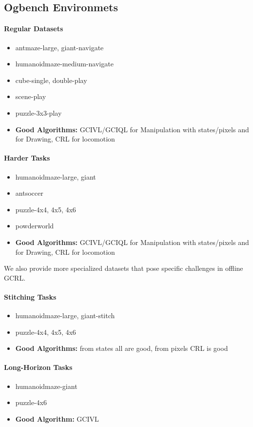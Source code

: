 \documentclass{article}
\theoremstyle{plain}
\theoremstyle{definition}
\theoremstyle{remark}
\begin{document}
\subsection{Ogbench Environmets}
\paragraph{Regular Datasets}
\begin{itemize}
    \item antmaze-{large, giant}-navigate
    \item humanoidmaze-medium-navigate
    \item cube-{single, double}-play
    \item scene-play
    \item puzzle-3x3-play
    \item \textbf{Good Algorithms:} GCIVL/GCIQL for Manipulation with states/pixels and for Drawing, CRL for locomotion
\end{itemize}

\paragraph{Harder Tasks}
\begin{itemize}
    \item humanoidmaze-{large, giant}
    \item antsoccer
    \item puzzle-{4x4, 4x5, 4x6}
    \item powderworld
    \item \textbf{Good Algorithms:} GCIVL/GCIQL for Manipulation with states/pixels and for Drawing, CRL for locomotion
\end{itemize}

We also provide more specialized datasets that pose specific challenges in offline GCRL.

\paragraph{Stitching Tasks}
\begin{itemize}
    \item humanoidmaze-{large, giant}-stitch
    \item puzzle-{4x4, 4x5, 4x6}
    \item \textbf{Good Algorithms:} from states all are good, from pixels CRL is good
\end{itemize}

\paragraph{Long-Horizon Tasks}
\begin{itemize}
    \item humanoidmaze-giant
    \item puzzle-4x6
    \item \textbf{Good Algorithm:} GCIVL
\end{itemize}
\end{document}
